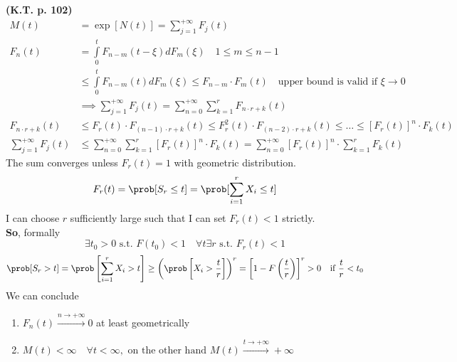\textbf{(K.T. p. 102)}
\begin{equation}
  \begin{split}
    M(t) &= \exp[N(t)] = \sum\limits_{j=1}^{+\infty}F_j(t) \\
    F_n(t) &= \int\limits_0^t F_{n-m}(t-\xi) dF_m(\xi) \quad 1 \le m \le n-1\\
    & \le \int\limits_0^t F_{n-m}(t) dF_m(\xi) \le F_{n-m} \cdot F_m(t) \quad \text{upper bound is valid if }\xi \to 0 \\
    &\implies  \sum\limits_{j=1}^{+\infty}F_j(t)= \sum\limits_{n=0}^{+\infty} \sum\limits_{k=1}^{r}F_{n \cdot r + k}(t) \\
    F_{n \cdot r + k} (t) &\le F_r(t) \cdot F_{(n-1)\cdot r + k}(t) \le F_r^2(t) \cdot F_{(n-2)\cdot r +k}(t) \le \dots
    \le \left[F_r(t)\right]^n \cdot F_k(t)\\
    \sum\limits_{j=1}^{+\infty}F_j(t) &\le \sum\limits_{n=0}^{+\infty} \sum\limits_{k=1}^{r}\left[F_r(t)\right]^n \cdot F_k(t)
    = \sum\limits_{n=0}^{+\infty} \left[F_r(t)\right]^n \cdot \sum\limits_{k=1}^{r}F_k(t)
  \end{split}
\end{equation}
The sum converges unless $F_r(t)=1$ with geometric distribution.
\begin{equation}
  F_r(t)=\prob[S_r\le t]=\prob[\sum\limits_{i=1}^r X_i \le t]
\end{equation}
I can choose $r$ sufficiently large such that I can set $F_r(t)<1$ strictly. \\
\textbf{So}, formally
  $$\exists t_0 >0 \text{ s.t. } F(t_0)<1 \quad \forall t  \exists r \text{ s.t. } F_r(t)<1$$
\begin{equation*}
  \prob[S_r >t] = \prob\left[\sum\limits_{i=1}^r X_i > t \right] \ge
  \left(\prob\left[X_i > \frac{t}{r}\right]\right)^r = \left[1-F\left(\frac{t}{r}\right)\right]^r>0
  \quad \text{if }\frac{t}{r}<t_0
\end{equation*}
We can conclude
\begin{enumerate}
  \item $F_n(t)\xrightarrow{n\to +\infty}0$ at least geometrically
  \item $M(t)<\infty \quad \forall t < \infty, \text{ on the other hand }  M(t)\xrightarrow{t \to +\infty}+\infty$
\end{enumerate}

